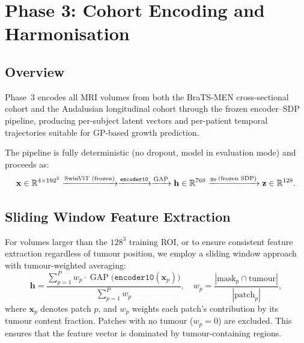 \section{Phase 3: Cohort Encoding and Harmonisation}
\label{sec:encoding}

\subsection{Overview}
\label{sec:enc:overview}

Phase~3 encodes all MRI volumes from both the BraTS-MEN cross-sectional
cohort and the Andalusian longitudinal cohort through the frozen
encoder--SDP pipeline, producing per-subject latent vectors and per-patient
temporal trajectories suitable for GP-based growth prediction.

The pipeline is fully deterministic (no dropout, model in evaluation mode)
and proceeds as:
\begin{equation}
  \mathbf{x} \in \mathbb{R}^{4 \times 192^3}
  \xrightarrow{\text{SwinViT (frozen)}}
  \xrightarrow{\texttt{encoder10}}
  \xrightarrow{\text{GAP}}
  \mathbf{h} \in \mathbb{R}^{768}
  \xrightarrow{g_\theta\,\text{(frozen SDP)}}
  \mathbf{z} \in \mathbb{R}^{128}.
  \label{eq:encoding_pipeline}
\end{equation}

\subsection{Sliding Window Feature Extraction}
\label{sec:enc:sliding_window}

For volumes larger than the $128^3$ training ROI, or to ensure consistent
feature extraction regardless of tumour position, we employ a sliding window
approach with tumour-weighted averaging:
\begin{equation}
  \mathbf{h} = \frac{\sum_{p=1}^{P} w_p \cdot \operatorname{GAP}
    \bigl(\texttt{encoder10}(\mathbf{x}_p)\bigr)}
    {\sum_{p=1}^{P} w_p},
  \quad w_p = \frac{|\text{mask}_p \cap \text{tumour}|}{|\text{patch}_p|},
  \label{eq:sliding_window}
\end{equation}
where $\mathbf{x}_p$ denotes patch $p$, and $w_p$ weights each patch's
contribution by its tumour content fraction. Patches with no tumour
($w_p = 0$) are excluded. This ensures that the feature vector is dominated
by tumour-containing regions.

